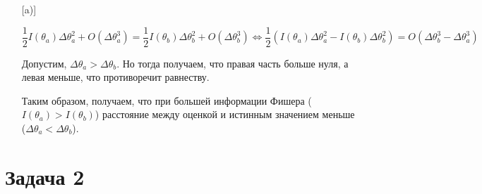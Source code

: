 \documentclass[12pt,letterpaper]{article}
\begin{document}
\begin{enumerate} [a)]
{        $$\frac{1}{2}I(\theta_a)\Delta \theta_a^2 + O(\Delta \theta_a^3) = \frac{1}{2}I(\theta_b)\Delta \theta_b^2 + O(\Delta \theta_b^3) \iff \frac{1}{2}(I(\theta_a)\Delta\theta_a^2 - I(\theta_b)\Delta\theta_b^2) = O(\Delta\theta_b^3 - \Delta\theta_a^3)$$
        
        Допустим, $\Delta\theta_a > \Delta\theta_b$. Но тогда получаем, что правая часть больше нуля, а левая меньше, что противоречит равнеству.
        
        Таким образом, получаем, что при большей информации Фишера ($I(\theta_a) > I(\theta_b)$) расстояние между оценкой и истинным значением меньше ($\Delta\theta_a < \Delta\theta_b$).
    }
\end{enumerate}

\section*{Задача 2}
\end{document}
